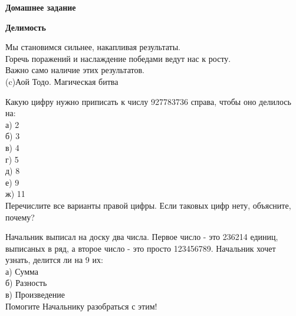 \centerline{\bf \Huge Домашнее задание}
\centerline{\bf \Huge Делимость}

\begin{flushright}
        \scriptsize{Мы становимся сильнее, накапливая результаты.\\ Горечь поражений и наслаждение победами ведут нас к росту.\\ Важно само наличие этих результатов.\\ (c)Аой Тодо. Магическая битва}
\end{flushright}

 Какую цифру нужно приписать к числу 927783736 справа, чтобы оно делилось на:\\
а) 2\\
б) 3\\
в) 4\\
г) 5\\
д) 8\\
е) 9\\
ж) 11\\
Перечислите все варианты правой цифры. Если таковых цифр нету, объясните, почему?

 Начальник выписал на доску два числа. Первое число - это 236214 единиц, выписаных в ряд, а второе число - это просто 123456789. Начальник хочет узнать, делится ли на 9 их:\\
а) Сумма\\
б) Разность\\
в) Произведение\\
Помогите Начальнику разобраться с этим!
